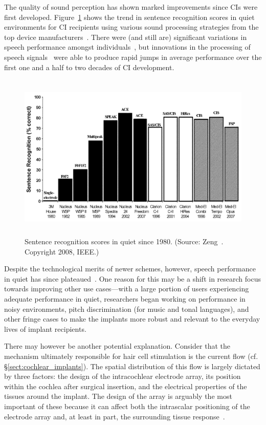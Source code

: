 The quality of sound perception has shown marked improvements since CIs were
first developed. Figure~\ref{fig:sentence_recognition} shows the trend in
sentence recognition scores in quiet environments for CI recipients using
various sound processing strategies from the top device
manufacturers~\cite{zeng2008}. There were (and still are) significant variations
in speech performance amongst individuals~\cite{loizou1998}, but innovations in
the processing of speech signals~\cite{wilson1991nature,clark1996, loizou1998}
were able to produce rapid jumps in average performance over the first one and a
half to two decades of CI development.

\begin{figure}
	\centering
	\includegraphics[height=8cm]{Introduction/sentence_recognition}
	\caption[Sentence recognition scores in quiet since 1980]{Sentence recognition
	scores in quiet since 1980. (Source: Zeng~\cite{zeng2008}. Copyright 
	\textcopyright{} 2008, IEEE.)}
	\label{fig:sentence_recognition}
\end{figure} 

Despite the technological merits of newer schemes, however, speech performance
in quiet has since plateaued~\cite{seligman2004,vandenhonert2007,zeng2008}. One
reason for this may be a shift in research focus towards improving other use
cases---with a large portion of users experiencing adequate performance in
quiet, researchers began working on performance in noisy environments, pitch
discrimination (for music and tonal languages), and other fringe cases to make
the implants more robust and relevant to the everyday lives of implant
recipients.

There may however be another potential explanation. Consider that the mechanism
ultimately responsible for hair cell stimulation is the \invivo{} current flow
(cf. \S\ref{sect:cochlear_implants}). The spatial distribution of this flow is
largely dictated by three factors: the design of the intracochlear electrode
array, its position within the cochlea after surgical insertion, and the
electrical properties of the tissues around the implant. The design of the array
is arguably the most important of these because it can affect both the
intrascalar positioning of the electrode array and, at least in part, the
surrounding tissue
response~\cite{miller1997,tykocinski2000,briggs2001,vanderbeek2005,
wardrop2005a,wardrop2005b,richardson2009}.

